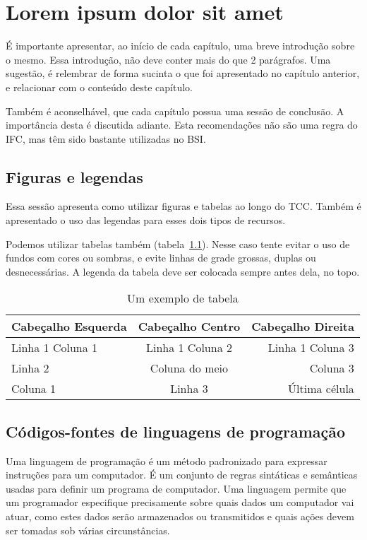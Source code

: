 \chapter{Lorem ipsum dolor sit amet}

É importante apresentar, ao início de cada capítulo, uma breve introdução sobre o mesmo. Essa introdução, não deve conter mais do que 2 parágrafos. Uma sugestão, é relembrar de forma sucinta o que foi apresentado no capítulo anterior, e relacionar com o conteúdo deste capítulo.

Também é aconselhável, que cada capítulo possua uma sessão de conclusão. A importância desta é discutida adiante. Esta recomendações não são uma regra do IFC, mas têm sido bastante utilizadas no BSI. 

\section{Figuras e legendas}\label{sec:figs}

Essa sessão apresenta como utilizar figuras e tabelas ao longo do TCC. Também é apresentado o uso das legendas para esses dois tipos de recursos. 

Podemos utilizar tabelas também (tabela~\ref{tab:exTabela}). Nesse caso tente evitar o uso de fundos com cores ou sombras, e evite linhas de grade grossas, duplas ou desnecessárias. A legenda da tabela deve ser colocada sempre antes dela, no topo.

\begin{table}[htbp]
\centering
\caption{Um exemplo de tabela}
\label{tab:exTabela}
\begin{tabular}{l|c|r} \hline
Cabeçalho Esquerda & Cabeçalho Centro & Cabeçalho Direita \\ 
\hline \hline
Linha 1 Coluna 1   & Linha 1 Coluna 2 & Linha 1 Coluna 3  \\
Linha 2            & Coluna do meio   & Coluna 3          \\
Coluna 1           & Linha 3          & Última célula     \\
\hline
\end{tabular}
\end{table}

\section{Códigos-fontes de linguagens de programação}

Uma linguagem de programação é um método padronizado para expressar instruções para um computador. É um conjunto de regras sintáticas e semânticas usadas para definir um programa de computador. Uma linguagem permite que um programador especifique precisamente sobre quais dados um computador vai atuar, como estes dados serão armazenados ou transmitidos e quais ações devem ser tomadas sob várias circunstâncias.

